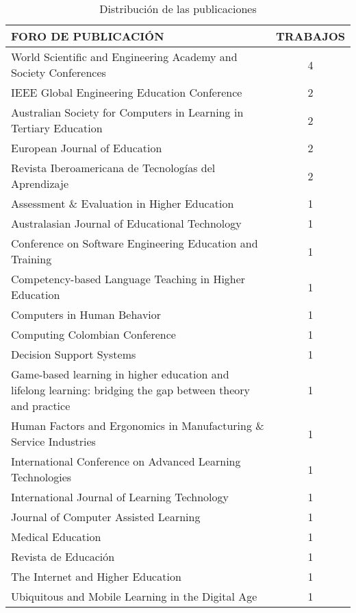 \begin{table}[H]
  \begin{center}
  \begin{tabular}{| m{12cm} | c |}
    \hline
    FORO DE PUBLICACIÓN & TRABAJOS\\
    \hline
    \hline 
    World Scientific and Engineering Academy and Society Conferences & 4\\
    \hline
    IEEE Global Engineering Education Conference & 2\\
    \hline
    Australian Society for Computers in Learning in Tertiary Education & 2\\
    \hline
    European Journal of Education & 2\\
    \hline
    Revista Iberoamericana de Tecnologías del Aprendizaje & 2\\
    \hline
    Assessment \& Evaluation in Higher Education & 1\\
    \hline
    Australasian Journal of Educational Technology & 1\\
    \hline
    Conference on Software Engineering Education and Training & 1\\
    \hline
    Competency-based Language Teaching in Higher Education & 1\\
    \hline
    Computers in Human Behavior & 1\\
    \hline
    Computing Colombian Conference & 1\\
    \hline
    Decision Support Systems & 1\\
    \hline
    Game-based learning in higher education and lifelong learning: bridging the gap between theory and practice & 1\\
    \hline
    Human Factors and Ergonomics in Manufacturing \& Service Industries & 1\\
    \hline
    International Conference on Advanced Learning Technologies & 1\\
    \hline
    International Journal of Learning Technology & 1\\
    \hline
    Journal of Computer Assisted Learning & 1\\
    \hline
    Medical Education & 1\\
    \hline
    Revista de Educación & 1\\
    \hline
    The Internet and Higher Education & 1\\
    \hline
    Ubiquitous and Mobile Learning in the Digital Age & 1 \\
    \hline
  \end{tabular}
\end{center}
\caption{Distribución de las publicaciones}
\label{tab:DistribucionPublicaciones}
\end{table} 



